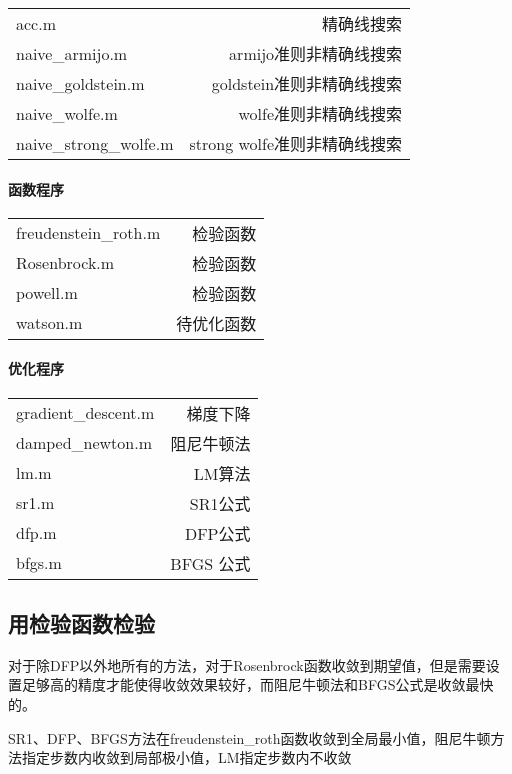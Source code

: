\documentclass[11pt, a4paper]{article}
\begin{document}
\begin{tabular}{|l|r|}
	\hline
	acc.m & 精确线搜索\\
	naive\_armijo.m & armijo准则非精确线搜索\\
	naive\_goldstein.m & goldstein准则非精确线搜索\\
	naive\_wolfe.m & wolfe准则非精确线搜索\\
	naive\_strong\_wolfe.m & strong wolfe准则非精确线搜索\\\hline
\end{tabular}

\paragraph{函数程序}

\begin{tabular}{|l|r|}
	\hline
	freudenstein\_roth.m & 检验函数\\
	Rosenbrock.m & 检验函数\\
	powell.m & 检验函数\\
	watson.m & 待优化函数\\\hline
\end{tabular}

\paragraph{优化程序}

\begin{tabular}{|l|r|}
	\hline
	gradient\_descent.m & 梯度下降\\
	damped\_newton.m & 阻尼牛顿法\\
	lm.m & LM算法\\
	sr1.m & SR1公式\\
	dfp.m & DFP公式\\
	bfgs.m & BFGS 公式\\\hline
\end{tabular}

\subsection{用检验函数检验}

对于除DFP以外地所有的方法，对于Rosenbrock函数收敛到期望值，但是需要设置足够高的精度才能使得收敛效果较好，而阻尼牛顿法和BFGS公式是收敛最快的。

SR1、DFP、BFGS方法在freudenstein\_roth函数收敛到全局最小值，阻尼牛顿方法指定步数内收敛到局部极小值，LM指定步数内不收敛
\end{document}
